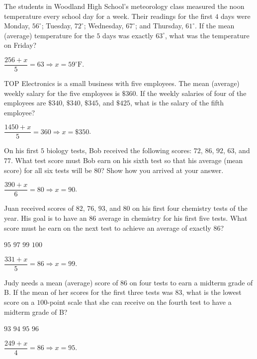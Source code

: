 \question[5]
The students in Woodland High School's meteorology class measured the noon temperature every school day for a week. Their readings for the first $4$ days were Monday, $56^{\circ}$; Tuesday, $72^{\circ}$; Wednesday, $67^{\circ}$; and Thursday, $61^{\circ}$. If the mean (average) temperature for the $5$ days was exactly $63^{\circ}$, what was the temperature on Friday?
\begin{solution}
  $\dfrac{256+x}{5}=63\Rightarrow x=59^{\circ}\mathrm{F}$.
\end{solution}

\question[5]
TOP Electronics is a small business with five employees. The mean (average) weekly salary for the five employees is $\$360$. If the weekly salaries of four of the employees are $\$340$, $\$340$, $\$345$, and $\$425$, what is the salary of the fifth employee?
\begin{solution}
  $\dfrac{1450+x}{5}=360\Rightarrow x=\$350$.
\end{solution}

\question[10]
On his first $5$ biology tests, Bob received the following scores: $72$, $86$, $92$, $63$, and $77$. What test score must Bob earn on his sixth test so that his average (mean score) for all six tests will be $80$? Show how you arrived at your answer.
\makeemptybox{1.4in}
\begin{solution}
  $\dfrac{390+x}{6}=80\Rightarrow x=90$.
\end{solution}


\newpage



\question[5]
Juan received scores of $82$, $76$, $93$, and $80$ on his first four chemistry tests of the year. His goal is to have an $86$ average in chemistry for his first five tests. What score must he earn on the next test to achieve an average of exactly $86$?
\begin{choices}
  \choice $95$
  \choice $97$
  \CorrectChoice $99$
  \choice $100$
\end{choices}
\begin{solution}
  $\dfrac{331+x}{5}=86\Rightarrow x=99$.
\end{solution}

\question[5]
Judy needs a mean (average) score of $86$ on four tests to earn a midterm grade of B. If the mean of her scores for the first three tests was $83$, what is the lowest score on a $100$-point scale that she can receive on the fourth test to have a midterm grade of B?
\begin{choices}
  \choice $93$
  \choice $94$
  \CorrectChoice $95$
  \choice $96$
\end{choices}
\begin{solution}
  $\dfrac{249+x}{4}=86\Rightarrow x=95$.
\end{solution}

